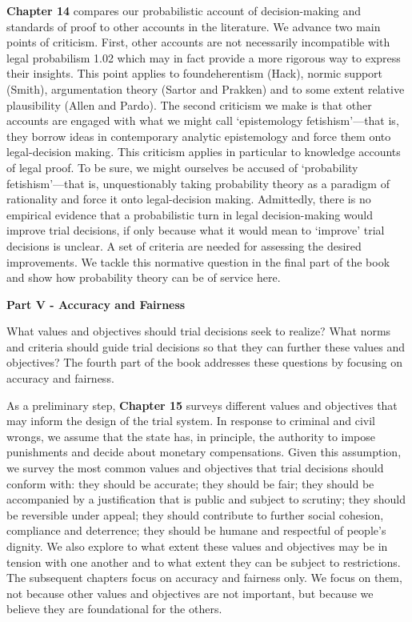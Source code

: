 \documentclass[
  10pt,
  dvipsnames,enabledeprecatedfontcommands]{scrartcl}
\begin{document}
\textbf{Chapter 14} compares our probabilistic account of
decision-making and standards of proof to other accounts in the
literature. We advance two main points of criticism. First, other
accounts are not necessarily incompatible with legal probabilism 1.02
which may in fact provide a more rigorous way to express their insights.
This point applies to foundeherentism (Hack), normic support (Smith),
argumentation theory (Sartor and Prakken) and to some extent relative
plausibility (Allen and Pardo). The second criticism we make is that
other accounts are engaged with what we might call `epistemology
fetishism'---that is, they borrow ideas in contemporary analytic
epistemology and force them onto legal-decision making. This criticism
applies in particular to knowledge accounts of legal proof. To be sure,
we might ourselves be accused of `probability fetishism'---that is,
unquestionably taking probability theory as a paradigm of rationality
and force it onto legal-decision making. Admittedly, there is no
empirical evidence that a probabilistic turn in legal decision-making
would improve trial decisions, if only because what it would mean to
`improve' trial decisions is unclear. A set of criteria are needed for
assessing the desired improvements. We tackle this normative question in
the final part of the book and show how probability theory can be of
service here.

\vspace{3mm}

\noindent \textbf{Part V - Accuracy and Fairness}

\noindent What values and objectives should trial decisions seek to
realize? What norms and criteria should guide trial decisions so that
they can further these values and objectives? The fourth part of the
book addresses these questions by focusing on accuracy and fairness.

As a preliminary step, \textbf{Chapter 15} surveys different values and
objectives that may inform the design of the trial system. In response
to criminal and civil wrongs, we assume that the state has, in
principle, the authority to impose punishments and decide about monetary
compensations. Given this assumption, we survey the most common values
and objectives that trial decisions should conform with: they should be
accurate; they should be fair; they should be accompanied by a
justification that is public and subject to scrutiny; they should be
reversible under appeal; they should contribute to further social
cohesion, compliance and deterrence; they should be humane and
respectful of people's dignity. We also explore to what extent these
values and objectives may be in tension with one another and to what
extent they can be subject to restrictions. The subsequent chapters
focus on accuracy and fairness only. We focus on them, not because other
values and objectives are not important, but because we believe they are
foundational for the others.
\end{document}
